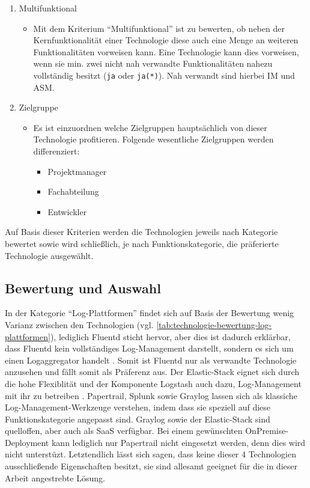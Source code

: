 \begin{enumerate}
	\item Multifunktional
	\begin{itemize}
		\item Mit dem Kriterium \enquote{Multifunktional} ist zu bewerten, ob neben der Kernfunktionalität einer Technologie diese auch eine Menge an weiteren Funktionalitäten vorweisen kann. Eine Technologie kann dies vorweisen, wenn sie min. zwei nicht nah verwandte Funktionalitäten nahezu vollständig besitzt (\texttt{ja} oder \texttt{ja(*)}). Nah verwandt sind hierbei IM und ASM.
	\end{itemize}

	\item Zielgruppe
	\begin{itemize}
		\item Es ist einzuordnen welche Zielgruppen hauptsächlich von dieser Technologie profitieren. Folgende wesentliche Zielgruppen werden differenziert:
		\begin{itemize}
			\item Projektmanager
			\item Fachabteilung
			\item Entwickler
		\end{itemize}
	\end{itemize}
\end{enumerate}

Auf Basis dieser Kriterien werden die Technologien jeweils nach Kategorie bewertet sowie wird schließlich, je nach Funktionskategorie, die präferierte Technologie ausgewählt.

\subsection{Bewertung und Auswahl}
\label{subsec:bewertung-und-auswahl}

In der Kategorie \enquote{Log-Plattformen} findet sich auf Basis der Bewertung wenig Varianz zwischen den Technologien (vgl. \autoref{tab:technologie-bewertung-log-plattformen}), lediglich Fluentd sticht hervor, aber dies ist dadurch erklärbar, dass Fluentd kein vollständiges Log-Management darstellt, sondern es sich um einen Logaggregator handelt \cite{FluentdAggregator}. Somit ist Fluentd nur als verwandte Technologie anzusehen und fällt somit als Präferenz aus. Der Elastic-Stack eignet sich durch die hohe Flexiblität und der Komponente Logstash auch dazu, Log-Management mit ihr zu betreiben  \cite{ThreatIdentificationFromAccessLogsUsingElasticStack} \cite{DesignLogManagementSystem}. Papertrail, Splunk sowie Graylog lassen sich als klassiche Log-Management-Werkzeuge verstehen, indem dass sie speziell auf diese Funktionskategorie angepasst sind. Graylog sowie der Elastic-Stack sind quelloffen, aber auch als SaaS verfügbar. Bei einem gewünschten OnPremise-Deployment kann lediglich nur Papertrail nicht eingesetzt werden, denn dies wird nicht unterstüzt. Letztendlich lässt sich sagen, dass keine dieser 4 Technologien ausschließende Eigenschaften besitzt, sie sind allesamt geeignet für die in dieser Arbeit angestrebte Lösung.

